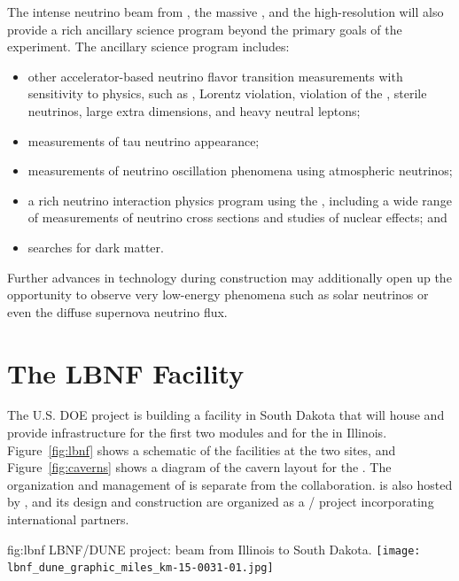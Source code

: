 The intense neutrino beam from , the massive   , and the high-resolution
  will also provide a rich ancillary science program beyond the primary goals of the experiment. The ancillary science program includes:
\begin{itemize}
     \item other accelerator-based neutrino flavor transition measurements with sensitivity to  physics, such as , Lorentz violation,  violation of the , sterile neutrinos, large extra dimensions, and heavy neutral leptons;
     \item measurements of tau neutrino appearance;
     \item measurements of neutrino oscillation phenomena using atmospheric neutrinos;
     \item a rich neutrino interaction physics program using the  , including a wide range of measurements of neutrino cross sections and studies of nuclear effects; and
     \item  searches for dark matter.
\end{itemize} 
Further advances in  
technology during   construction may additionally open up the opportunity to observe very low-energy phenomena such as solar neutrinos or even the diffuse supernova neutrino flux.


\section{The LBNF Facility} 

The U.S. DOE  project is building a facility in South Dakota that will house and provide infrastructure for the first two   modules and for the  in Illinois.  Figure~\ref{fig:lbnf} shows
a schematic of the facilities at the two sites, and Figure~\ref{fig:caverns} shows a diagram of the cavern layout for the .  
The organization and management of  is separate from the  collaboration.  is also hosted by , and its design and construction are organized as a / project incorporating international partners. 




\begin{dunefigure}{fig:lbnf}{ 	
LBNF/DUNE project: beam from Illinois to South Dakota.}
\texttt{[image: lbnf\_dune\_graphic\_miles\_km-15-0031-01.jpg]}
\end{dunefigure}

